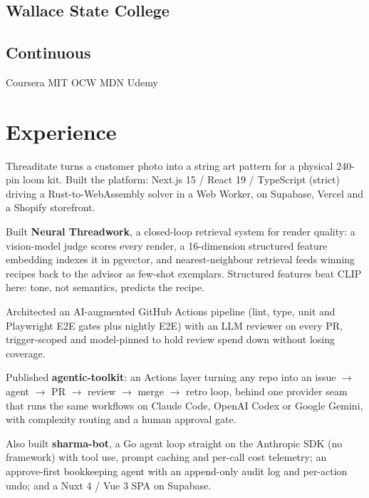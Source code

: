 \documentclass[]{pb-resume}
\begin{document}
\begin{minipage}[t]{0.33\textwidth}
\subsection{Wallace State College}
\sectionsep

\subsection{Continuous}
Coursera \textbullet{} MIT OCW \textbullet{} MDN \textbullet{} Udemy
\sectionsep

\end{minipage}
\hfill
\begin{minipage}[t]{0.66\textwidth}

\section{Experience}
\vspace{6pt} %
\begin{tightemize}

\item Threaditate turns a customer photo into a string art pattern for a physical 240-pin loom kit. Built the platform: Next.js 15 / React 19 / TypeScript (strict) driving a Rust-to-WebAssembly solver in a Web Worker, on Supabase, Vercel and a Shopify storefront.
\item Built \textbf{Neural Threadwork}, a closed-loop retrieval system for render quality: a vision-model judge scores every render, a 16-dimension structured feature embedding indexes it in pgvector, and nearest-neighbour retrieval feeds winning recipes back to the advisor as few-shot exemplars. Structured features beat CLIP here: tone, not semantics, predicts the recipe.
\item Architected an AI-augmented GitHub Actions pipeline (lint, type, unit and Playwright E2E gates plus nightly E2E) with an LLM reviewer on every PR, trigger-scoped and model-pinned to hold review spend down without losing coverage.
\item Published \textbf{agentic-toolkit}: an Actions layer turning any repo into an issue $\rightarrow$ agent $\rightarrow$ PR $\rightarrow$ review $\rightarrow$ merge $\rightarrow$ retro loop, behind one provider seam that runs the same workflows on Claude Code, OpenAI Codex or Google Gemini, with complexity routing and a human approval gate.
\item Also built \textbf{sharma-bot}, a Go agent loop straight on the Anthropic SDK (no framework) with tool use, prompt caching and per-call cost telemetry; an approve-first bookkeeping agent with an append-only audit log and per-action undo; and a Nuxt 4 / Vue 3 SPA on Supabase.


\end{tightemize}
\end{minipage}
\end{document}
